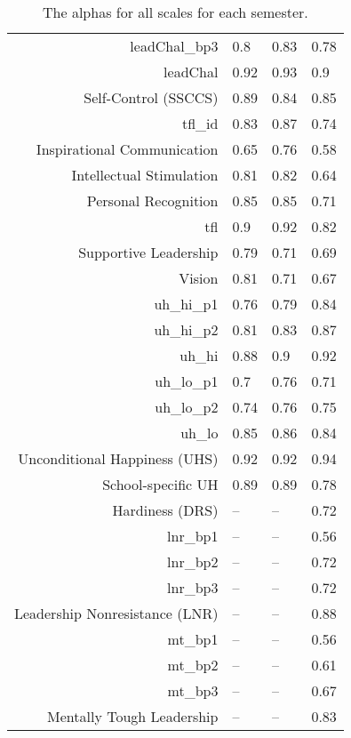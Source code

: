\begin{table}[ht]
\begin{tabular}{rlll}
  leadChal\_bp3 & 0.8 & 0.83 & 0.78 \\ 
  leadChal & 0.92 & 0.93 & 0.9 \\ 
  Self-Control (SSCCS) & 0.89 & 0.84 & 0.85 \\ 
  tfl\_id & 0.83 & 0.87 & 0.74 \\ 
  Inspirational Communication & 0.65 & 0.76 & 0.58 \\ 
  Intellectual Stimulation & 0.81 & 0.82 & 0.64 \\ 
  Personal Recognition & 0.85 & 0.85 & 0.71 \\ 
  tfl & 0.9 & 0.92 & 0.82 \\ 
  Supportive Leadership & 0.79 & 0.71 & 0.69 \\ 
  Vision & 0.81 & 0.71 & 0.67 \\ 
  uh\_hi\_p1 & 0.76 & 0.79 & 0.84 \\ 
  uh\_hi\_p2 & 0.81 & 0.83 & 0.87 \\ 
  uh\_hi & 0.88 & 0.9 & 0.92 \\ 
  uh\_lo\_p1 & 0.7 & 0.76 & 0.71 \\ 
  uh\_lo\_p2 & 0.74 & 0.76 & 0.75 \\ 
  uh\_lo & 0.85 & 0.86 & 0.84 \\ 
  Unconditional Happiness (UHS) & 0.92 & 0.92 & 0.94 \\ 
  School-specific UH & 0.89 & 0.89 & 0.78 \\ 
  Hardiness (DRS) & -- & -- & 0.72 \\ 
  lnr\_bp1 & -- & -- & 0.56 \\ 
  lnr\_bp2 & -- & -- & 0.72 \\ 
  lnr\_bp3 & -- & -- & 0.72 \\ 
  Leadership Nonresistance (LNR) & -- & -- & 0.88 \\ 
  mt\_bp1 & -- & -- & 0.56 \\ 
  mt\_bp2 & -- & -- & 0.61 \\ 
  mt\_bp3 & -- & -- & 0.67 \\ 
  Mentally Tough Leadership & -- & -- & 0.83 \\ 
   \hline
\end{tabular}
\caption{The alphas for all scales for each semester.} 
\label{tab:alphas}
\end{table}
